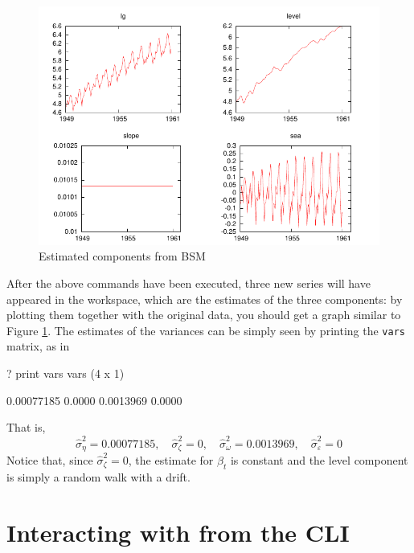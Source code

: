 \begin{figure}[htbp]
  \centering
  \includegraphics{figures/BSM-output}
  \caption{Estimated components from BSM}
  \label{fig:BSM-output}
\end{figure}

After the above commands have been executed, three new series will
have appeared in the  workspace, which are the estimates of
the three components: by plotting them together with the original
data, you should get a graph similar to Figure
\ref{fig:BSM-output}. The estimates of the variances can be simply
seen by printing the \texttt{vars} matrix, as in

\begin{code}
? print vars
vars (4 x 1)

  0.00077185 
      0.0000 
   0.0013969 
      0.0000 
\end{code}

That is,
\begin{equation*}
  \hat{\sigma}^2_{\eta} = 0.00077185, \quad
  \hat{\sigma}^2_{\zeta} = 0, \quad
  \hat{\sigma}^2_{\omega} = 0.0013969, \quad
  \hat{\sigma}^2_{\varepsilon} = 0
\end{equation*}
Notice that, since $\hat{\sigma}^2_{\zeta} = 0$, the estimate for
$\beta_t$ is constant and the level component is simply a random walk
with a drift.

\section{Interacting with  from the CLI}
\label{sec:foreign-command}

